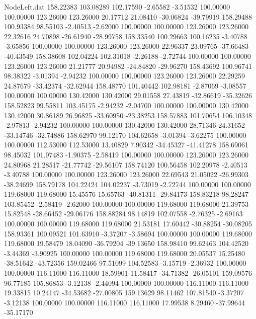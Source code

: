 \begin{filecontents}{NodeLeft.dat}
 158.22383  103.08289  102.17590    -2.65582   -3.51532  100.00000  100.00000  123.26000  123.26000   20.17712   21.08410  -30.06824  -39.79919
 158.29488  100.93384   98.55103    -2.40513   -2.62000  100.00000  100.00000  123.26000  123.26000   22.32616   24.70898  -26.61940  -28.99758
 158.33540  100.29663  100.16235    -3.40788   -3.65856  100.00000  100.00000  123.26000  123.26000   22.96337   23.09765  -37.66483  -40.43549
 158.38608  102.04224  102.31018    -2.26188   -2.72744  100.00000  100.00000  123.26000  123.26000   21.21777   20.94982  -24.84820  -29.96270
 158.43692  100.96741   98.38322    -3.01394   -2.94232  100.00000  100.00000  123.26000  123.26000   22.29259   24.87679  -33.42374  -32.62944
 158.48770  101.40442  102.98181    -2.87069   -3.08557  100.00000  100.00000  130.42000  130.42000   29.01558   27.43819  -32.86619  -35.32626
 158.52823   99.55811  103.45175    -2.94232   -2.04700  100.00000  100.00000  130.42000  130.42000   30.86189   26.96825  -33.60950  -23.38253
 158.57883  101.70654  106.10348    -2.97813   -2.94232  100.00000  100.00000  130.42000  130.42000   28.71346   24.31652  -33.14746  -32.74886
 158.62970   99.12170  104.62658    -3.01394   -3.62275  100.00000  100.00000  112.53000  112.53000   13.40829    7.90342  -34.45327  -41.41278
 158.69061   98.45032  101.97483    -1.90375   -2.58419  100.00000  100.00000  123.26000  123.26000   24.80968   21.28517  -21.77742  -29.56107
 158.74120  100.56458  102.20978    -2.40513   -3.40788  100.00000  100.00000  123.26000  123.26000   22.69543   21.05022  -26.99303  -38.24699
 158.79178  104.22424  104.02237    -3.73019   -2.72744  100.00000  100.00000  119.68000  119.68000   15.45576   15.65763  -40.81311  -29.84173
 158.83218   98.28247  103.85452    -2.58419   -2.62000  100.00000  100.00000  119.68000  119.68000   21.39753   15.82548  -28.66452  -29.06176
 158.88284   98.14819  102.07558    -2.76325   -2.69163  100.00000  100.00000  119.68000  119.68000   21.53181   17.60442  -30.88254  -30.08205
 158.93361  100.09521  101.63910    -3.37207   -3.58694  100.00000  100.00000  119.68000  119.68000   19.58479   18.04090  -36.79204  -39.13650
 158.98410   99.62463  104.42520    -3.44369   -3.90925  100.00000  100.00000  119.68000  119.68000   20.05537   15.25480  -38.51642  -43.72356
 159.02466   97.51099  104.52583    -3.15719   -2.36932  100.00000  100.00000  116.11000  116.11000   18.59901   11.58417  -34.71382  -26.05101
 159.09576   96.77185  105.86853    -3.12138   -2.44094  100.00000  100.00000  116.11000  116.11000   19.33815   10.24147  -34.53682  -27.00805
 159.13629   98.11462  107.81540    -3.37207   -3.12138  100.00000  100.00000  116.11000  116.11000   17.99538    8.29460  -37.99644  -35.17170

\end{filecontents}
